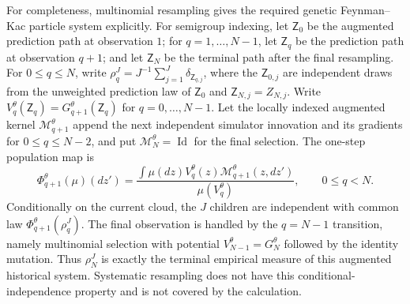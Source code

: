 \documentclass[11pt]{article}
\theoremstyle{thmstylethree}%
\begin{document}
For completeness, multinomial resampling gives the required genetic
Feynman--Kac particle system explicitly.  For semigroup indexing, let
$\mathsf Z_0$ be the augmented prediction path at observation $1$; for
$q=1,\ldots,N-1$, let $\mathsf Z_q$ be the prediction path at observation
$q+1$; and let $\mathsf Z_N$ be the terminal path after the final resampling.
For $0\leq q\leq N$, write
$\rho_q^J=J^{-1}\sum_{j=1}^J\delta_{\mathsf Z_{q,j}}$, where the
$\mathsf Z_{0,j}$ are independent draws from the unweighted prediction law of
$\mathsf Z_0$ and $\mathsf Z_{N,j}=Z_{N,j}$.
Write $V_q^\theta(\mathsf Z_q)=G_{q+1}^\theta(\mathsf Z_q)$ for
$q=0,\ldots,N-1$.  Let the locally indexed augmented kernel
$\mathcal M_{q+1}^\theta$ append the next independent simulator innovation and
its gradients for $0\leq q\leq N-2$, and put
$\mathcal M_N^\theta=\operatorname{Id}$ for the final selection.  The one-step
population map is
\begin{equation}
\Phi_{q+1}^\theta(\mu)(dz')
=\frac{\int\mu(dz)V_q^\theta(z)\mathcal M_{q+1}^\theta(z,dz')}
       {\mu(V_q^\theta)},\qquad 0\leq q<N.                    \label{eq:s2-fk-update}
\end{equation}
Conditionally on the current cloud, the $J$ children are independent with
common law $\Phi_{q+1}^\theta(\rho_q^J)$.  The final observation is handled by
the $q=N-1$ transition, namely multinomial selection with potential
$V_{N-1}^\theta=G_N^\theta$ followed by the identity mutation.  Thus
$\rho_N^J$ is exactly the terminal empirical measure of this augmented
historical system.  Systematic resampling does not have this
conditional-independence property and is not covered by the calculation.
\end{document}
